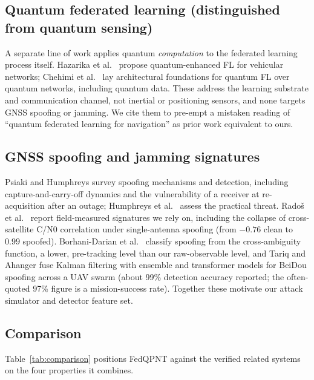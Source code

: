 \documentclass[12pt,a4paper]{article}
\begin{document}
\subsection{Quantum federated learning (distinguished from quantum sensing)}
A separate line of work applies quantum \emph{computation} to the federated learning process itself. Hazarika et al.\ \cite{hazarika2025quantum} propose quantum-enhanced FL for vehicular networks; Chehimi et al.\ \cite{chehimi2023foundations,chehimi2022quantum} lay architectural foundations for quantum FL over quantum networks, including quantum data. These address the learning substrate and communication channel, not inertial or positioning sensors, and none targets GNSS spoofing or jamming. We cite them to pre-empt a mistaken reading of ``quantum federated learning for navigation'' as prior work equivalent to ours.

\subsection{GNSS spoofing and jamming signatures}
Psiaki and Humphreys \cite{psiaki2016gnss} survey spoofing mechanisms and detection, including capture-and-carry-off dynamics and the vulnerability of a receiver at re-acquisition after an outage; Humphreys et al.\ \cite{humphreys2008assessing} assess the practical threat. Radoš et al.\ \cite{rados2024recent} report field-measured signatures we rely on, including the collapse of cross-satellite C/N0 correlation under single-antenna spoofing (from $-0.76$ clean to $0.99$ spoofed). Borhani-Darian et al.\ \cite{borhanidarian2024detecting} classify spoofing from the cross-ambiguity function, a lower, pre-tracking level than our raw-observable level, and Tariq and Ahanger \cite{tariq2026multimodel} fuse Kalman filtering with ensemble and transformer models for BeiDou spoofing across a UAV swarm (about 99\% detection accuracy reported; the often-quoted 97\% figure is a mission-success rate). Together these motivate our attack simulator and detector feature set.

\subsection{Comparison}
Table~\ref{tab:comparison} positions FedQPNT against the verified related systems on the four properties it combines.
\end{document}
